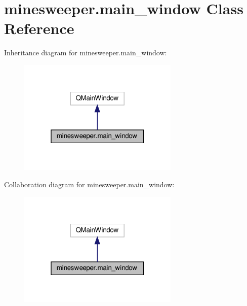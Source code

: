 \hypertarget{classminesweeper_1_1main__window}{}\section{minesweeper.\+main\+\_\+window Class Reference}
\label{classminesweeper_1_1main__window}


Inheritance diagram for minesweeper.\+main\+\_\+window\+:
\nopagebreak
\begin{figure}[H]
\begin{center}
\leavevmode
\includegraphics[width=217pt]{classminesweeper_1_1main__window__inherit__graph}
\end{center}
\end{figure}


Collaboration diagram for minesweeper.\+main\+\_\+window\+:
\nopagebreak
\begin{figure}[H]
\begin{center}
\leavevmode
\includegraphics[width=217pt]{classminesweeper_1_1main__window__coll__graph}
\end{center}
\end{figure}
